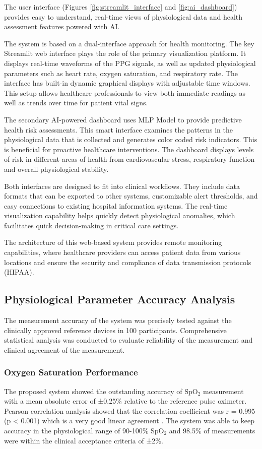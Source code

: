 \documentclass{ieeeaccess}
\begin{document}
The user interface (Figures \ref{fig:streamlit_interface} and \ref{fig:ai_dashboard}) provides easy to understand, real-time views of physiological data and health assessment features powered with AI.

The system is based on a dual-interface approach for health monitoring. The key Streamlit web interface plays the role of the primary visualization platform. It displays real-time waveforms of the PPG signals, as well as updated physiological parameters such as heart rate, oxygen saturation, and respiratory rate. The interface has built-in dynamic graphical displays with adjustable time windows. This setup allows healthcare professionals to view both immediate readings as well as trends over time for patient vital signs.

The secondary AI-powered dashboard uses MLP Model to provide predictive health risk assessments. This smart interface examines the patterns in the physiological data that is collected and generates color coded risk indicators. This is beneficial for proactive healthcare interventions. The dashboard displays levels of risk in different areas of health from cardiovascular stress, respiratory function and overall physiological stability.

Both interfaces are designed to fit into clinical workflows. They include data formats that can be exported to other systems, customizable alert thresholds, and easy connections to existing hospital information systems. The real-time visualization capability helps quickly detect physiological anomalies, which facilitates quick decision-making in critical care settings.

The architecture of this web-based system provides remote monitoring capabilities, where healthcare providers can access patient data from various locations and ensure the security and compliance of data transmission protocols (HIPAA).

\subsection{Physiological Parameter Accuracy Analysis}


The measurement accuracy of the system was precisely tested against the clinically approved reference devices in 100 participants. Comprehensive statistical analysis was conducted to evaluate reliability of the measurement and clinical agreement of the measurement.

\subsubsection{Oxygen Saturation Performance}
The proposed system showed the outstanding accuracy of SpO$_2$ measurement with a mean absolute error of ±0.25\% relative to the reference pulse oximeter.  Pearson correlation analysis showed that the correlation coefficient was r = 0.995 (p < 0.001) which is a very good linear agreement \cite{b10}. The system was able to keep accuracy in the physiological range of 90-100\% SpO$_2$ and 98.5\% of measurements were within the clinical acceptance criteria of ±2\%.
\end{document}
